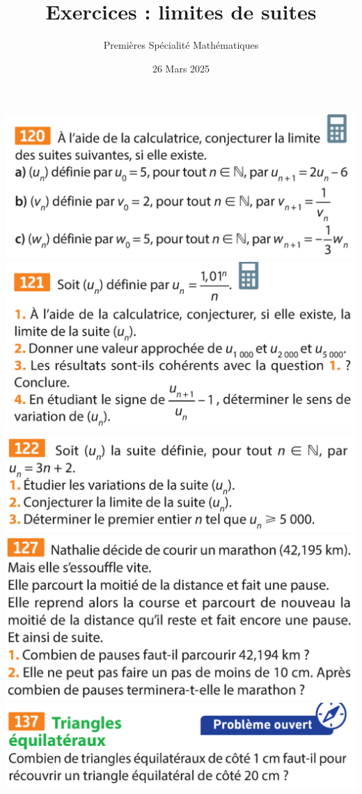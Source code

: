 \documentclass{article}
\title{Exercices : limites de suites}
\author{Premières Spécialité Mathématiques}
\date{26 Mars 2025}
\begin{document}
\maketitle

\begin{center}
\includegraphics[width=\textwidth]{Exercice_1.png}
\includegraphics[width=\textwidth]{Exercice_2.png}
\includegraphics[width=\textwidth]{Exercice_3.png}
\includegraphics[width=\textwidth]{Exercice_4.png}
\includegraphics[width=\textwidth]{Exercice_5.png}
\end{center}
\end{document}
